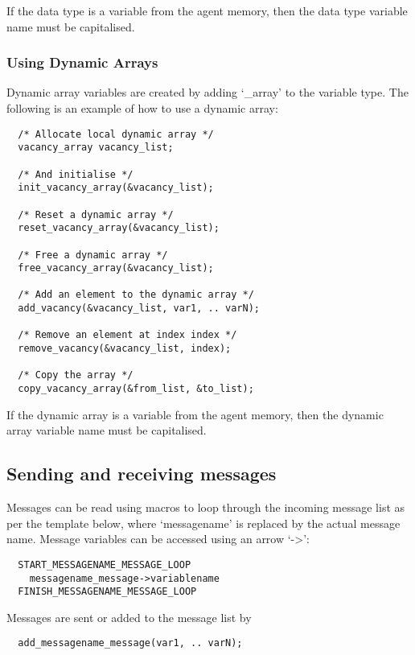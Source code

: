 If the data type is a variable from the agent memory, then the data type
variable name must be capitalised.

\subsubsection{Using Dynamic Arrays}

Dynamic array variables are created by adding `\_array' to the variable type.
The following is an example of how to use a dynamic array:

\begin{verbatim}
  /* Allocate local dynamic array */
  vacancy_array vacancy_list;

  /* And initialise */
  init_vacancy_array(&vacancy_list);
  
  /* Reset a dynamic array */
  reset_vacancy_array(&vacancy_list);
  
  /* Free a dynamic array */
  free_vacancy_array(&vacancy_list);
  
  /* Add an element to the dynamic array */
  add_vacancy(&vacancy_list, var1, .. varN);
  
  /* Remove an element at index index */
  remove_vacancy(&vacancy_list, index);
  
  /* Copy the array */
  copy_vacancy_array(&from_list, &to_list);
\end{verbatim}

If the dynamic array is a variable from the agent memory, then the dynamic
array variable name must be capitalised.

\subsection{Sending and receiving messages}

Messages can be read using macros to loop through the incoming message list as
per the template below, where `messagename' is replaced by the actual message
name. Message variables can be accessed using an arrow `->':

\begin{verbatim}
  START_MESSAGENAME_MESSAGE_LOOP
    messagename_message->variablename
  FINISH_MESSAGENAME_MESSAGE_LOOP
\end{verbatim}

Messages are sent or added to the message list by
\begin{verbatim}
  add_messagename_message(var1, .. varN);
\end{verbatim}
